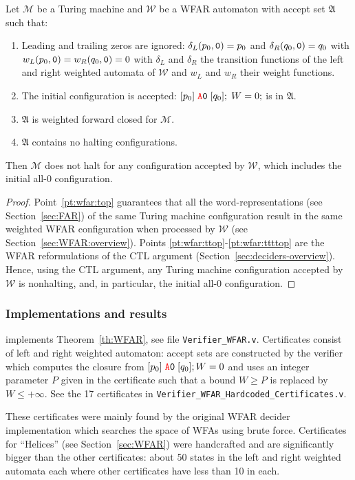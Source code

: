 \begin{theorem}\label{th:WFAR}
    Let $\mathcal{M}$ be a Turing machine and $\mathcal{W}$ be a WFAR automaton with accept set $\mathfrak{A}$ such that:
    \begin{enumerate}
        \item Leading and trailing zeros are ignored: $\delta_L(p_0,\texttt{0}) = p_0$ and $\delta_R(q_0,\texttt{0}) = q_0$ with $w_L(p_0,\texttt{0}) = w_R(q_0,\texttt{0}) = 0$ with $\delta_L$ and $\delta_R$ the transition functions of the left and right weighted automata of $\mathcal{W}$ and $w_L$ and $w_R$ their weight functions.\label{pt:wfar:top}
        \item The initial configuration is accepted: \ie $[p_0]\; \texttt{\stateA}\szero\; [q_0];\; W=0;$ is in $\mathfrak{A}$.\label{pt:wfar:ttop}
        \item $\mathfrak{A}$ is weighted forward closed for $\mathcal{M}$.\label{pt:wfar:tttop}
        \item $\mathfrak{A}$ contains no halting configurations.\label{pt:wfar:ttttop}
    \end{enumerate}

    Then $\mathcal{M}$ does not halt for any configuration accepted by $\mathcal{W}$, which includes the initial all-0 configuration.
\end{theorem}
\begin{proof}
    Point~\ref{pt:wfar:top} guarantees that all the word-representations (see Section~\ref{sec:FAR}) of the same Turing machine configuration result in the same weighted WFAR configuration when processed by $\mathcal{W}$ (see Section~\ref{sec:WFAR:overview}). Points \ref{pt:wfar:ttop}-\ref{pt:wfar:ttttop} are the WFAR reformulations of the CTL argument (Section~\ref{sec:deciders-overview}). Hence, using the CTL argument, any Turing machine configuration accepted by $\mathcal{W}$ is nonhalting, and, in particular, the initial all-0 configuration.
\end{proof}





\subsubsection{Implementations and results}\label{sec:WFAR:results}

\CoqBB implements Theorem~\ref{th:WFAR}, see file \texttt{Verifier\_WFAR.v}. Certificates consist of left and right weighted automaton: accept sets are constructed by the \Coq verifier which computes the closure from $[p_0]\; \texttt{\stateA} \szero\; [q_0]; W=0$ and uses an integer parameter $P$ given in the certificate such that a bound $W \geq P$ is replaced by $W \leq +\infty$. See the 17 certificates in \texttt{Verifier\_WFAR\_Hardcoded\_Certificates.v}.

These certificates were mainly found by the original WFAR decider implementation \cite{iijil1_2025_14914502} which searches the space of WFAs using brute force. Certificates for ``Helices'' (see Section~\ref{sec:WFAR}) were handcrafted and are significantly bigger than the other certificates: about 50 states in the left and right weighted automata each where other certificates have less than 10 in each.